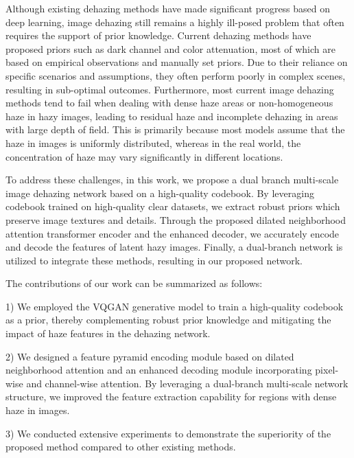 \documentclass[lettersize,journal]{IEEEtran}
\begin{document}
Although existing dehazing methods have made significant progress based on deep learning, image dehazing  still remains a highly ill-posed problem that often requires the support of prior knowledge. Current dehazing methods have proposed priors such as dark channel\cite{he2010single} and color attenuation\cite{land1971lightness}, most of which are based on empirical observations and manually set priors\cite{cai2016dehazenet, li2017aod}. Due to their reliance on specific scenarios and assumptions, they often perform poorly in complex scenes, resulting in sub-optimal outcomes. Furthermore, most current image dehazing methods tend to fail when dealing with dense haze areas or non-homogeneous haze in hazy images, leading to residual haze and incomplete dehazing in areas with large depth of field. This is primarily because most models assume that the haze in images is uniformly distributed, whereas in the real world, the concentration of haze may vary significantly in different locations.

To address these challenges, in this work, we propose a dual branch multi-scale image dehazing network based on a high-quality codebook. By leveraging codebook trained on high-quality clear datasets, we extract robust priors which preserve image textures and details. Through the proposed dilated neighborhood attention transformer encoder and the enhanced decoder, we accurately encode and decode the features of latent hazy images. Finally, a dual-branch network is utilized to integrate these methods, resulting in our proposed network.

The contributions of our work can be summarized as follows:

\begin{list}{}{}
\item{1) We employed the VQGAN generative model to train a high-quality codebook as a prior, thereby complementing robust prior knowledge and mitigating the impact of haze features in the dehazing network.}

\item{2) We designed a feature pyramid encoding module based on dilated neighborhood attention and an enhanced decoding module incorporating pixel-wise and channel-wise attention. By leveraging a dual-branch multi-scale network structure, we improved the feature extraction capability for regions with dense haze in images.}

\item{3) We conducted extensive experiments to demonstrate the superiority of the proposed method compared to other existing methods.}
\end{list}
 
\end{document}

